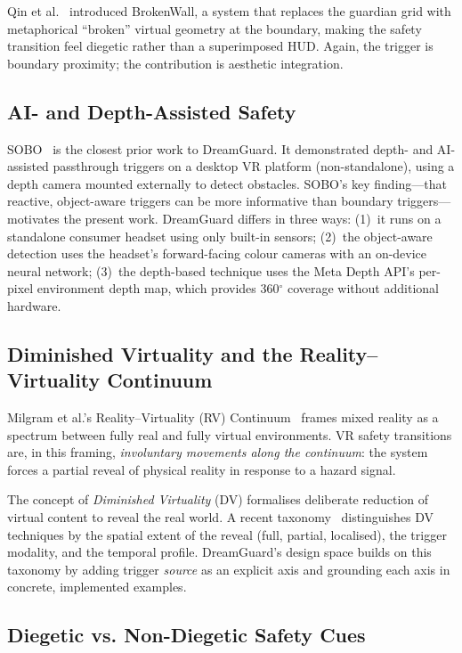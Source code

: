 \documentclass{styling/vgtc} %
\begin{document}
Qin et al.~\cite{qin2024brokenwall} introduced BrokenWall, a system
that replaces the guardian grid with metaphorical ``broken'' virtual
geometry at the boundary, making the safety transition feel diegetic
rather than a superimposed HUD. Again, the trigger is boundary proximity;
the contribution is aesthetic integration.

\subsection{AI- and Depth-Assisted Safety}

SOBO~\cite{sobo2024} is the closest prior work to DreamGuard. It
demonstrated depth- and AI-assisted passthrough triggers on a desktop VR
platform (non-standalone), using a depth camera mounted externally to
detect obstacles. SOBO's key finding---that reactive, object-aware
triggers can be more informative than boundary triggers---motivates the
present work. DreamGuard differs in three ways: (1)~it runs on a
standalone consumer headset using only built-in sensors; (2)~the
object-aware detection uses the headset's forward-facing colour cameras
with an on-device neural network; (3)~the depth-based technique uses
the Meta Depth API's per-pixel environment depth map, which provides
360$^\circ$ coverage without additional hardware.

\subsection{Diminished Virtuality and the Reality--Virtuality Continuum}

Milgram et al.'s Reality--Virtuality (RV) Continuum~\cite{milgram1994} frames
mixed reality as a spectrum between fully real and fully virtual
environments. VR safety transitions are, in this framing,
\emph{involuntary movements along the continuum}: the system forces a
partial reveal of physical reality in response to a hazard signal.

The concept of \emph{Diminished Virtuality} (DV) formalises deliberate
reduction of virtual content to reveal the real world. A recent
taxonomy~\cite{jmir2024dv} distinguishes DV techniques by the spatial
extent of the reveal (full, partial, localised), the trigger modality,
and the temporal profile. DreamGuard's design space builds on this
taxonomy by adding trigger \emph{source} as an explicit axis and
grounding each axis in concrete, implemented examples.

\subsection{Diegetic vs. Non-Diegetic Safety Cues}
\end{document}
